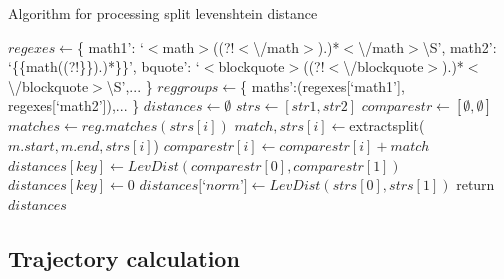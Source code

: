 \documentclass[t]{beamer}
\newcommand{\tab}[1]{\hspace{.08\textwidth}{#1}} %
\begin{document}
\begin{frame}{Algorithm for processing split levenshtein distance}
  \tiny
  \begin{algorithmic}
    \State $regexes \gets $\{
    \Statex \tab`math1': `$<$math$>$((?!$<${\textbackslash}/math$>$).)*$<${\textbackslash}/math$>${\textbackslash}S',
    \Statex \tab`math2': `\{\{math((?!\}\}).)*\}\}',
    \Statex \tab`bquote': `$<$blockquote$>$((?!$<${\textbackslash}/blockquote$>$).)*$<${\textbackslash}/blockquote$>${\textbackslash}S',...
    \Statex\}
    \State $reggroups \gets $\{\label{dist-calc-groups}
    \Statex  \tab`maths':(regexes[`math1'], regexes[`math2']),...
    \Statex \}
    \State $distances \gets \emptyset$
    \State $strs \gets [str1, str2]$
    \State $comparestr \gets [\emptyset , \emptyset]$
    \State $matches \gets reg.matches(strs[i])$
    \State $match, strs[i] \gets $extractsplit($m.start, m.end, strs[i]$)
    \State $comparestr[i] \gets comparestr[i] + match$
    \EndFor
    \EndFor
    \State $distances[key] \gets LevDist(comparestr[0], comparestr[1])$ \label{mprocess-spawn}
    \Else
    \State $distances[key] \gets 0$
    \EndIf
    \EndFor
    \State $distances[$`$norm$'$] \gets LevDist(strs[0], strs[1])$
    \State return $distances$\label{mprocess-return}
    \EndFunction
  \end{algorithmic}
\end{frame}

  \subsection{Trajectory calculation}
  
\end{document}
